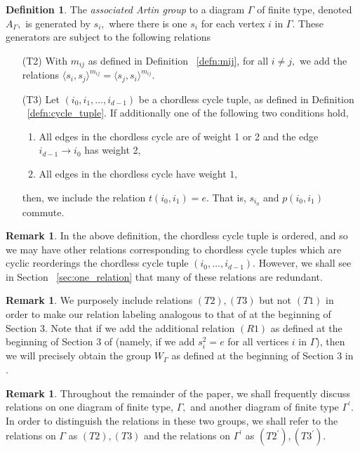 \documentclass[11pt]{amsart}
\theoremstyle{definition}
\newtheorem{defn}[thm]{Definition}
\newtheorem{rem}[thm]{Remark}
\begin{document}
\begin{defn} \label{grp def}
The {\it associated Artin group} to a diagram $\Gamma$ of finite type, denoted $A_\Gamma,$ is generated by $s_i,$ where there is one $s_i$ for each vertex $i$ in $\Gamma.$ These generators are subject to the following relations
\begin{itemize}
\item[(T2)] With $m_{ij}$ as defined in Definition ~\ref{defn:mij}, for all $i \neq j,$ we add the relations
$\langle s_i,s_j \rangle^{m_{ij}}= \langle s_j,s_i \rangle^{m_{ij}}.$

\item[(T3)] Let $(i_0,i_1,\ldots,i_{d-1})$ be a chordless cycle tuple, as defined in Definition ~\ref{defn:cycle_tuple}. If additionally one of the following two conditions hold,
\begin{enumerate}
\item All edges in the chordless cycle are of weight 1 or 2 and the edge $i_{d-1}\rightarrow i_0$ has weight 2,
\item All edges in the chordless cycle have weight $1,$
\end{enumerate}
then, we include the relation
$t(i_0,i_1)=e.$ That is, $s_{i_0}$ and $p(i_0,i_1)$ commute.
\end{itemize}
\end{defn}

\begin{rem}
In the above definition, the chordless cycle tuple is ordered, and so we may have other relations corresponding to chordless cycle tuples which are cyclic reorderings the chordless cycle tuple $(i_0,\ldots, i_{d-1}).$ However, we shall see in Section ~\ref{sec:one_relation} that many of these relations are redundant.
\end{rem}

\begin{rem}
We purposely include relations $(T2),(T3)$ but not $(T1)$ in order to make our relation labeling analogous to that of \cite{BM13} at the beginning of Section 3. Note that if we add the additional relation $(R1)$ as defined at the beginning of Section 3 of \cite{BM13} (namely, if we add $s_i^2 = e$ for all vertices $i$ in $\Gamma$), then we will precisely obtain the group $W_\Gamma$ as defined at the beginning of Section 3 in \cite{BM13}.
\end{rem}

\begin{rem}
Throughout the remainder of the paper, we shall frequently discuss relations on one diagram of finite type, $\Gamma,$ and another diagram of finite type $\Gamma^\prime.$ In order to distinguish the relations in these two groups, we shall refer to the relations on $\Gamma$ as $(T2),(T3)$ and the relations on $\Gamma^\prime$ as $(T2^\prime),(T3^\prime).$
\end{rem}
\end{document}
